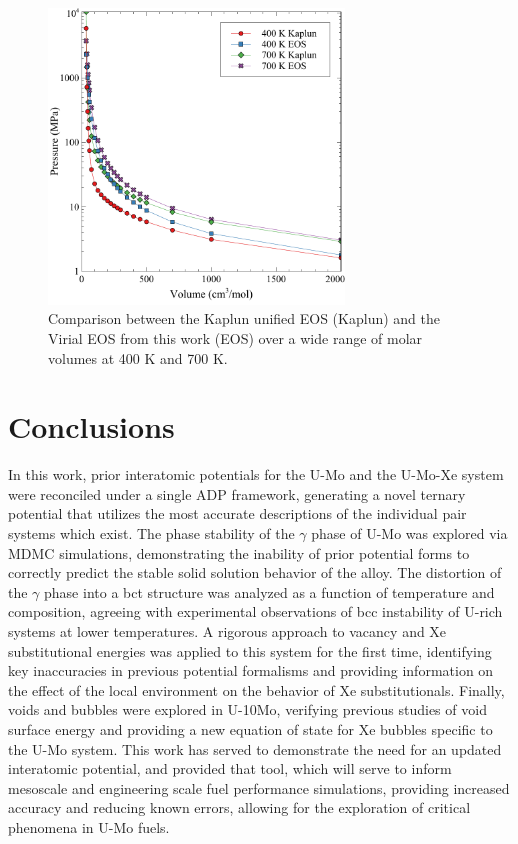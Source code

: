 \documentclass[review]{elsarticle}
\begin{document}
\begin{figure}[h!]
 \centering
 \includegraphics[width=0.7\textwidth]{kaplun_comp.pdf} 
 \caption{Comparison between the Kaplun unified EOS (Kaplun) and the Virial EOS from this work (EOS) over a wide range of molar volumes at 400 K and 700 K.}
 \label{fig:kap_comp}
\end{figure}


\FloatBarrier

\section{Conclusions}

In this work, prior interatomic potentials for the U-Mo and the U-Mo-Xe system were reconciled under a single ADP framework, generating a novel ternary potential that utilizes the most accurate descriptions of the individual pair systems which exist. The phase stability of the $\gamma$ phase of U-Mo was explored via MDMC simulations, demonstrating the inability of prior potential forms to correctly predict the stable solid solution behavior of the alloy. The distortion of the $\gamma$ phase into a bct structure was analyzed as a function of temperature and composition, agreeing with experimental observations of bcc instability of U-rich systems at lower temperatures. A rigorous approach to vacancy and Xe substitutional energies was applied to this system for the first time, identifying key inaccuracies in previous potential formalisms and providing information on the effect of the local environment on the behavior of Xe substitutionals. Finally, voids and bubbles were explored in U-10Mo, verifying previous studies of void surface energy and providing a new equation of state for Xe bubbles specific to the U-Mo system. This work has served to demonstrate the need for an updated interatomic potential, and provided that tool, which will serve to inform mesoscale and engineering scale fuel performance simulations, providing increased accuracy and reducing known errors, allowing for the exploration of critical phenomena in U-Mo fuels.
\end{document}
